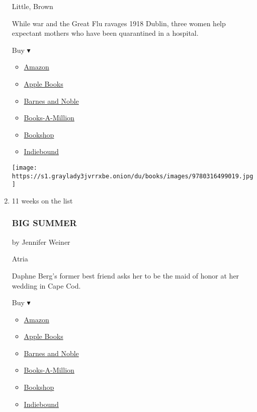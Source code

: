 \begin{enumerate}
  Little, Brown

  While war and the Great Flu ravages 1918 Dublin, three women help
  expectant mothers who have been quarantined in a hospital.

  Buy ▾

  \begin{itemize}
  \tightlist
  \item
    \href{https://www.amazon.com/dp/0316499013?tag=NYTBSREV-20\&tag=NYTBS-20}{Amazon}
  \item
    \href{https://du-gae-books-dot-nyt-du-prd.appspot.com/buy?title=THE+PULL+OF+THE+STARS\&author=Emma+Donoghue}{Apple
    Books}
  \item
    \href{https://www.anrdoezrs.net/click-7990613-11819508?url=https\%3A\%2F\%2Fwww.barnesandnoble.com\%2Fw\%2F\%3Fean\%3D9780316499019}{Barnes
    and Noble}
  \item
    \href{https://www.anrdoezrs.net/click-7990613-35140?url=https\%3A\%2F\%2Fwww.booksamillion.com\%2Fp\%2FTHE\%2BPULL\%2BOF\%2BTHE\%2BSTARS\%2FEmma\%2BDonoghue\%2F9780316499019}{Books-A-Million}
  \item
    \href{https://bookshop.org/a/3546/9780316499019}{Bookshop}
  \item
    \href{https://www.indiebound.org/book/9780316499019?aff=NYT}{Indiebound}
  \end{itemize}

  \texttt{[image: https://s1.graylady3jvrrxbe.onion/du/books/images/9780316499019.jpg]}
\item
  11 weeks on the list

  \hypertarget{big-summer}{%
  \subsubsection{BIG SUMMER}\label{big-summer}}

  by Jennifer Weiner

  Atria

  Daphne Berg's former best friend asks her to be the maid of honor at
  her wedding in Cape Cod.

  Buy ▾

  \begin{itemize}
  \tightlist
  \item
    \href{https://www.amazon.com/dp/1501133519?tag=NYTBSREV-20\&tag=NYTBS-20}{Amazon}
  \item
    \href{https://du-gae-books-dot-nyt-du-prd.appspot.com/buy?title=BIG+SUMMER\&author=Jennifer+Weiner}{Apple
    Books}
  \item
    \href{https://www.anrdoezrs.net/click-7990613-11819508?url=https\%3A\%2F\%2Fwww.barnesandnoble.com\%2Fw\%2F\%3Fean\%3D9781501133510}{Barnes
    and Noble}
  \item
    \href{https://www.anrdoezrs.net/click-7990613-35140?url=https\%3A\%2F\%2Fwww.booksamillion.com\%2Fp\%2FBIG\%2BSUMMER\%2FJennifer\%2BWeiner\%2F9781501133510}{Books-A-Million}
  \item
    \href{https://bookshop.org/a/3546/9781501133510}{Bookshop}
  \item
    \href{https://www.indiebound.org/book/9781501133510?aff=NYT}{Indiebound}
  \end{itemize}


\end{enumerate}
